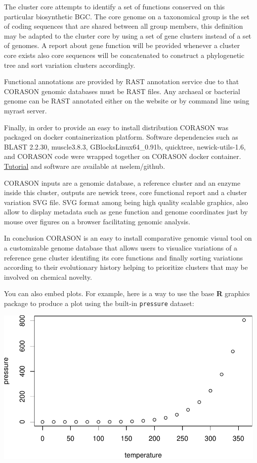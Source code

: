 \documentclass[12pt,twoside]{reedthesis}
\begin{document}
  The cluster core attempts to identify a set of functions conserved on
  this particular biosynthetic BGC. The core genome on a taxonomical group
  is the set of coding sequences that are shared between all group
  members, this definition may be adapted to the cluster core by using a
  set of gene clusters instead of a set of genomes. A report about gene
  function will be provided whenever a cluster core exists also core
  sequences will be concatenated to construct a phylogenetic tree and sort
  variation clusters accordingly.
  
  Functional annotations are provided by RAST annotation service due to
  that CORASON genomic databases must be RAST files. Any archaeal or
  bacterial genome can be RAST annotated either on the website or by
  command line using myrast server.
  
  Finally, in order to provide an easy to install distribution CORASON was
  packaged on docker containerization platform. Software dependencies such
  as BLAST 2.2.30, muscle3.8.3, GBlocksLinux64\_0.91b, quicktree,
  newick-utils-1.6, and CORASON code were wrapped together on CORASON
  docker container.
  \href{https://github.com/nselem/EvoDivMet/wiki}{Tutorial} and software
  are available at nselem/github.
  
  CORASON inputs are a genomic database, a reference cluster and an enzyme
  inside this cluster, outputs are newick trees, core functional report
  and a cluster variation SVG file. SVG format among being high quality
  scalable graphics, also allow to display metadata such as gene function
  and genome coordinates just by mouse over figures on a browser
  facilitating genomic analysis.
  
  In conclusion CORASON is an easy to install comparative genomic visual
  tool on a customizable genome database that allows users to visualice
  variations of a reference gene cluster identifing its core functions and
  finally sorting variations according to their evolutionary history
  helping to prioritize clusters that may be involved on chemical novelty.
  
  You can also embed plots. For example, here is a way to use the base
  \textbf{R} graphics package to produce a plot using the built-in
  \texttt{pressure} dataset:
  
  \begin{center}\includegraphics{tesis_files/figure-latex/pressure-1} \end{center}
  
\end{document}
